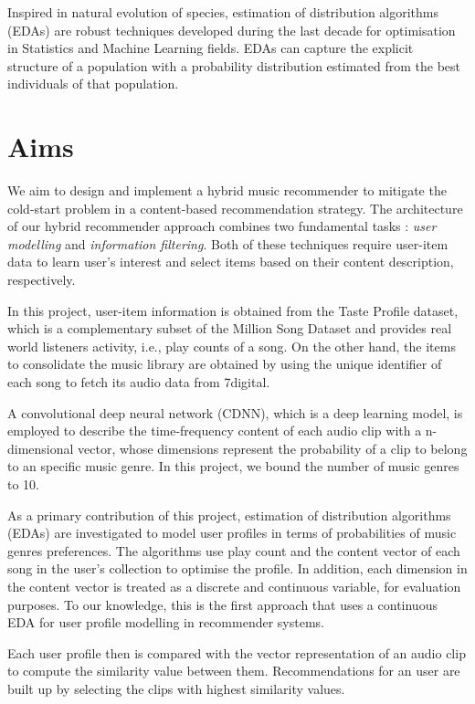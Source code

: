Inspired in natural evolution of species, estimation of distribution algorithms (EDAs) \parencite{larranaga2002estimation} are robust techniques developed during the last decade for optimisation in Statistics and Machine Learning fields. EDAs can capture the explicit structure of a population with a probability distribution estimated from the best individuals of that population.

\section{Aims}
We aim to design and implement a hybrid music recommender to mitigate the cold-start problem in a content-based recommendation strategy. The architecture of our hybrid recommender approach combines two fundamental tasks \parencite{recsys2012}: \textit{user modelling} and \textit{information filtering}. Both of these techniques require user-item data to learn user's interest and select items based on their content description, respectively.

In this project, user-item information is obtained from the Taste Profile dataset, which is a complementary subset of the Million Song Dataset \parencite{Bertin-Mahieux2011} and provides real world listeners activity, i.e., play counts of a song. On the other hand, the items to consolidate the music library are obtained by using the unique identifier of each song to fetch its audio data from 7digital.

A convolutional deep neural network (CDNN), which is a deep learning model, is employed to describe the time-frequency content of each audio clip with a n-dimensional vector, whose dimensions represent the probability of a clip to belong to an specific music genre. In this project, we bound the number of music genres to 10.

As a primary contribution of this project, estimation of distribution algorithms (EDAs) are investigated to model user profiles in terms of probabilities of music genres preferences. The algorithms use play count and the content vector of each song in the user's collection to optimise the profile. In addition, each dimension in the content vector is treated as a discrete and continuous variable, for evaluation purposes. To our knowledge, this is the first approach that uses a continuous EDA for user profile modelling in recommender systems.

Each user profile then is compared with the vector representation of an audio clip to compute the similarity value between them. Recommendations for an user are built up by selecting the clips with highest similarity values.

